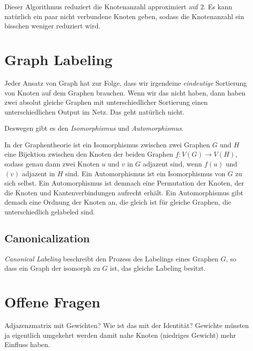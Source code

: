 \documentclass{scrartcl}
\begin{document}
Dieser Algorithmus reduziert die Knotenanzahl approximiert auf $2$.
Es kann natürlich ein paar nicht verbundene Knoten geben, sodass die Knotenanzahl ein bisschen weniger reduziert wird.

\section{Graph Labeling}

Jeder Ansatz von Graph hat zur Folge, dass wir irgendeine \emph{eindeutige} Sortierung von Knoten auf dem Graphen brauchen.
Wenn wir das nicht haben, dann haben zwei absolut gleiche Graphen mit unterschiedlicher Sortierung einen unterschiedlichen Output im Netz.
Das geht natürlich nicht.

Deswegen gibt es den \emph{Isomorphismus} und \emph{Automorphismus}.

In der Graphentheorie ist ein Isomorphismus zwischen zwei Graphen $G$ und $H$ eine Bijektion zwischen den Knoten der beiden Graphen $f: V(G) \rightarrow V(H)$, sodass genau dann zwei Knoten $u$ und $v$ in $G$ adjazent sind, wenn $f(u)$ und $(v)$ adjazent in $H$ sind.
Ein Automorphismus ist ein Isomorphismus von $G$ zu sich selbst.
Ein Automorphismus ist demnach eine Permutation der Knoten, der die Knoten und Kantenverbindungen aufrecht erhält.
Ein Automorphismus gibt demach eine Ordnung der Knoten an, die gleich ist für gleiche Graphen, die unterschiedlich gelabeled sind.

\subsection{Canonicalization}

\emph{Canonical Labeling} beschreibt den Prozess des Labelings eines Graphen $G$, so dass ein Graph der isomorph zu $G$ ist, das gleiche Labeling besitzt.

\section{Offene Fragen}

Adjazenzmatrix mit Gewichten? Wie ist das mit der Identität? Gewichte müssten ja eigentlich umgekehrt werden damit nahe Knoten (niedriges Gewicht) mehr Einfluss haben.
\end{document}
